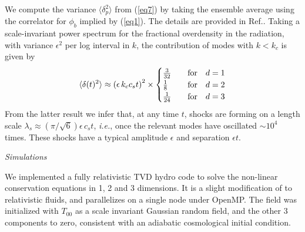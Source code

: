 \documentclass[prl,aps,10pt,twocolumn,showkeys,nofootinbib]{revtex4-1}
\def\bena{\begin{eqnarray}}
\def\eena{\end{eqnarray}}
\begin{document}
We compute the variance $\langle \delta_{p}^2 \rangle$ from (\ref{eq7}) by taking the ensemble average using the correlator for $\phi_b$ implied by (\ref{eq1}). The details are provided in Ref.\cite{penturoklong}. Taking a scale-invariant power spectrum for the fractional overdensity in the radiation, with variance $\epsilon^2$ per log interval in $k$, the contribution of modes with $k<k_c$ is given by 
\bena
 \langle \delta(t)^2\rangle \approx\left(\epsilon \,k_c c_s t\right)^2\times
  \begin{cases}
   {3\over 32}  & \quad  {\rm for} \quad d=1    \cr
  {1\over 8}     &\quad {\rm for} \quad d=2    \cr
  {1\over 24}     & \quad  {\rm for} \quad d=3   \cr
  \end{cases}
\label{eq8}
\eena
From the latter result we infer that, at any time $t$, shocks are forming on a length scale $\lambda_s\approx (\pi/\sqrt{6}) \epsilon \, c_s t$, {\it i.e.}, once the relevant modes have oscillated $\sim 10^4$ times. These shocks have a typical amplitude $\epsilon$ and separation $\epsilon t$. 

{\it Simulations}

We implemented a fully relativistic TVD hydro code to solve the non-linear conservation equations in 1, 2 and 3 dimensions. It is a slight modification of \cite{trac} to relativistic fluids, and parallelizes on a single node under OpenMP.   The field was initialized with $T_{00}$ as a scale invariant Gaussian random field, and the other 3 components to zero, consistent with an adiabatic cosmological initial condition.
\end{document}
